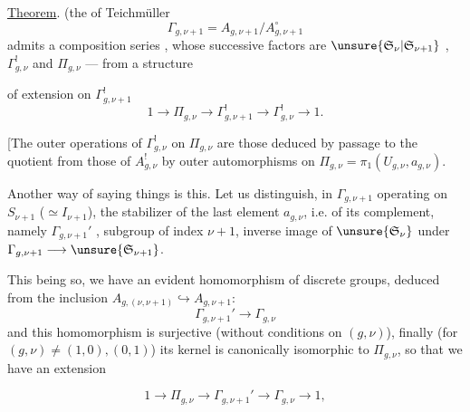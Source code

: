 \uline{Theorem}.  (the   of Teichmüller
\[
\Gamma_{g,\nu+1}=A_{g,\nu+1}/A_{g,\nu+1}^{\circ}
\]
admits a composition series , whose successive factors are $\unsure{\mathfrak S_\nu|\mathfrak S_{\nu+1}}$ , $\Gamma_{g,\nu}^{!}$ and $\Pi_{g,\nu}$ ---  from a structure

of extension on $\Gamma_{g,\nu+1}^{!}$
\[
\tag{41}
1\longrightarrow\Pi_{g,\nu}\longrightarrow\Gamma_{g,\nu+1}^{!}
\longrightarrow\Gamma_{g,\nu}^{!}\longrightarrow1.
\]

[The outer operations of $\Gamma_{g,\nu}^{!}$ on $\Pi_{g,\nu}$ are those deduced by passage to the quotient from those of $A_{g,\nu}^{!}$   by outer automorphisms on $\Pi_{g,\nu}=\pi_1(U_{g,\nu},a_{g,\nu})$.

Another way of saying things is this. Let us distinguish, in $\Gamma_{g,\nu+1}$ operating on $S_{\nu+1}$  ($\simeq I_{\nu+1}$), the stabilizer of the last element $a_{g,\nu}$, i.e. of its complement, namely $\Gamma_{g,\nu+1}'$ ,  subgroup of index $\nu+1$, inverse image of $\unsure{\mathfrak S_\nu}$  under $\Gamma_{g,\nu+1}\longrightarrow\unsure{\mathfrak S_{\nu+1}}$.

This being so, we have an evident homomorphism of discrete groups, deduced from the inclusion  $A_{g,(\nu,\nu+1)}\hookrightarrow A_{g,\nu+1}$:
\[
\tag{42}
\Gamma_{g,\nu+1}'\longrightarrow\Gamma_{g,\nu}
\]
and this homomorphism is surjective (without conditions on $(g,\nu)$), finally (for $(g,\nu)\ne(1,0),(0,1)$) its kernel is canonically isomorphic to $\Pi_{g,\nu}$, so that we have an extension


\[
\tag{43}
1\longrightarrow\Pi_{g,\nu}\longrightarrow\Gamma_{g,\nu+1}'
\longrightarrow\Gamma_{g,\nu}\longrightarrow1,
\]
